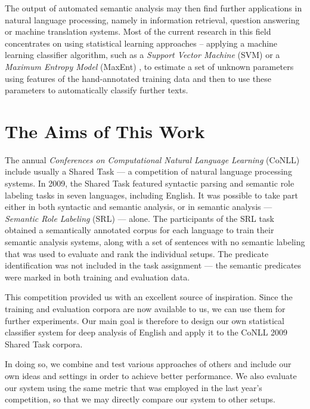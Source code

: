 \documentclass[12pt,notitlepage]{report}
\begin{document}
The output of automated semantic analysis may then find further applications in natural language processing, namely in information retrieval, question answering or machine translation systems. Most of the current research in this field concentrates on using statistical learning approaches -- applying a machine learning classifier algorithm, such as a \emph{Support Vector Machine} (SVM) \citep{boser92} or a \emph{Maximum Entropy Model} (MaxEnt) \citep{jelinek97}, to estimate a set of unknown parameters using features of the hand-annotated training data and then to use these parameters to automatically classify further texts.

\section{The Aims of This Work}\label{aims}

The annual \emph{Conferences on Computational Natural Language Learning} (CoNLL) include usually a Shared Task --- a competition of natural language processing systems. In 2009, the Shared Task \citep{hajic09} featured syntactic parsing and semantic role labeling tasks in seven languages, including English. It was possible to take part either in both syntactic and semantic analysis, or in semantic analysis --- \emph{Semantic Role Labeling} (SRL) --- alone. The participants of the SRL task obtained a semantically annotated corpus for each language to train their semantic analysis systems, along with a set of sentences with no semantic labeling that was used to evaluate and rank the individual setups. The predicate identification was not included in the task assignment --- the semantic predicates were marked in both training and evaluation data.

This competition provided us with an excellent source of inspiration. Since the training and evaluation corpora are now available to us, we can use them for further experiments. Our main goal is therefore to design our own statistical classifier system for deep analysis of English and apply it to the CoNLL 2009 Shared Task corpora. 

In doing so, we combine and test various approaches of others and include our own ideas and settings in order to achieve better performance. We also evaluate our system using the same metric that was employed in the last year's competition, so that we may directly compare our system to other setups.
\end{document}
